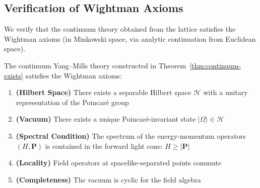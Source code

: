 
\subsection{Verification of Wightman Axioms}

We verify that the continuum theory obtained from the lattice satisfies the 
Wightman axioms (in Minkowski space, via analytic continuation from Euclidean space).

\begin{theorem}
\label{thm:wightman}
The continuum Yang--Mills theory constructed in Theorem~\ref{thm:continuum-exists} 
satisfies the Wightman axioms:
\begin{enumerate}[label=\textbf{W\arabic*:}]
\item \textbf{(Hilbert Space)} There exists a separable Hilbert space $\mathcal{H}$ 
with a unitary representation of the Poincar\'e group
\item \textbf{(Vacuum)} There exists a unique Poincar\'e-invariant state $|\Omega\rangle \in \mathcal{H}$
\item \textbf{(Spectral Condition)} The spectrum of the energy-momentum operators 
$(H, \mathbf{P})$ is contained in the forward light cone: $H \geq |\mathbf{P}|$
\item \textbf{(Locality)} Field operators at spacelike-separated points commute
\item \textbf{(Completeness)} The vacuum is cyclic for the field algebra
\end{enumerate}
\end{theorem}

